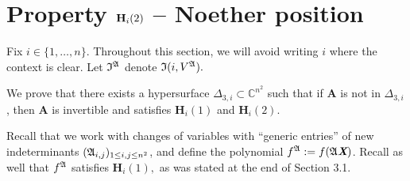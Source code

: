 \documentclass[sigconf]{acmart}
\def\Xb{\textit{\textbf{X}}}
\def\mA{{\bm A}}
\def\fA{{\frak A}}
\def\C{\mathbb{C}}
\def\D{\Delta}
\def\I{\frak{I}}
\def\A{\frak{A}}
\begin{document}

\section{Property ${\bf H}_i(2)$ -- Noether position}

Fix $i \in \{1,\hdots,n\}$. Throughout this section, we will avoid writing $i$ where the context is clear. Let $\I^{\A}$ denote $\I(i,V^{\A}).$ 

We prove that there exists a hypersurface $\D_{3,i} \subset
\C^{n^2}$ such that if $\mA$ is not in $\D_{3,i}$, then $\mA$ is
invertible and satisfies $\textbf{H}_i(1)$ and $\textbf{H}_i(2)$.

Recall that we work with changes of variables with ``generic entries'' of new indeterminants $(\frak
A_{i,j})_{1\le i,j \le n^2}$, and define the polynomial 
$f^\fA:=f(\fA \Xb)$. Recall as well that $f^\A$ satisfies $\textbf{H}_i(1),$ as was stated at the end of Section 3.1. 
%
\end{document}
